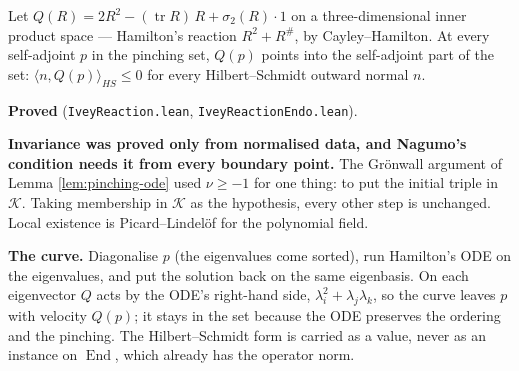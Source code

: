 \begin{lemma}
  \label{lem:ivey-reaction}
  \leanok
  Let $Q(R) = 2R^2 - (\operatorname{tr} R)\,R + \sigma_2(R)\cdot 1$ on a three-dimensional
  inner product space --- Hamilton's reaction $R^2 + R^\#$, by Cayley--Hamilton. At every
  self-adjoint $p$ in the pinching set, $Q(p)$ points into the self-adjoint part of the set:
  $\langle n, Q(p)\rangle_{HS} \le 0$ for every Hilbert--Schmidt outward normal $n$.

  \textbf{Proved} (\texttt{IveyReaction.lean}, \texttt{IveyReactionEndo.lean}).

  \textbf{Invariance was proved only from normalised data, and Nagumo's condition needs it from
  every boundary point.} The Grönwall argument of Lemma \ref{lem:pinching-ode} used
  $\nu \ge -1$ for one thing: to put the initial triple in $\mathcal{K}$. Taking membership in
  $\mathcal{K}$ as the hypothesis, every other step is unchanged. Local existence is
  Picard--Lindelöf for the polynomial field.

  \textbf{The curve.} Diagonalise $p$ (the eigenvalues come sorted), run Hamilton's ODE on the
  eigenvalues, and put the solution back on the same eigenbasis. On each eigenvector $Q$ acts by
  the ODE's right-hand side, $\lambda_i^2 + \lambda_j\lambda_k$, so the curve leaves $p$ with
  velocity $Q(p)$; it stays in the set because the ODE preserves the ordering and the pinching.
  The Hilbert--Schmidt form is carried as a value, never as an instance on $\operatorname{End}$,
  which already has the operator norm.
\end{lemma}

